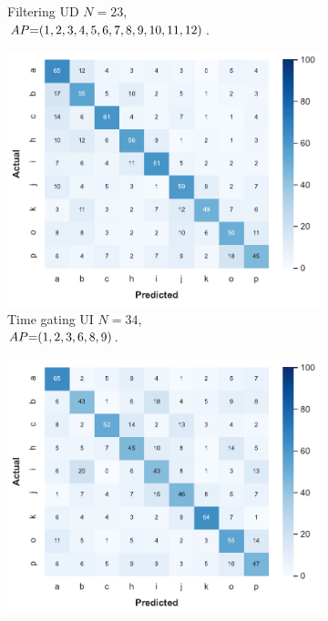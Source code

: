 \begin{figure}[ht]
\begin{subfigure}{.49\textwidth}
    \vspace{-15pt}
    \captionsetup{width=.99\linewidth}
    \caption{Filtering UD $N{=}23$, \\ $\splitatcommas{AP{=}(1, 2, 3, 4, 5, 6, 7, 8, 9, 10, 11, 12)}$.}
    \label{fig:radar-experiments:through-materials:glass-confusion:filtering-ud}
  \end{subfigure}

  \begin{subfigure}{.49\textwidth}
    \centering
    \includegraphics[width=.99\linewidth]{Figures/RadarExperiments/Datasets/ThroughMaterials/Glass/confusion-timegating-ui.pdf}  
    \vspace{-15pt}
    \captionsetup{width=.99\linewidth}
    \caption{Time gating UI $N{=}34$, \\ $\splitatcommas{AP{=}(1, 2, 3, 6, 8, 9)}$.}
    \label{fig:radar-experiments:through-materials:glass-confusion:timegating-ui}
  \end{subfigure}
  \begin{subfigure}{.49\textwidth}
    \centering
    \includegraphics[width=.99\linewidth]{Figures/RadarExperiments/Datasets/ThroughMaterials/Glass/confusion-filtering-ui.pdf}

\end{subfigure}
\end{figure}
